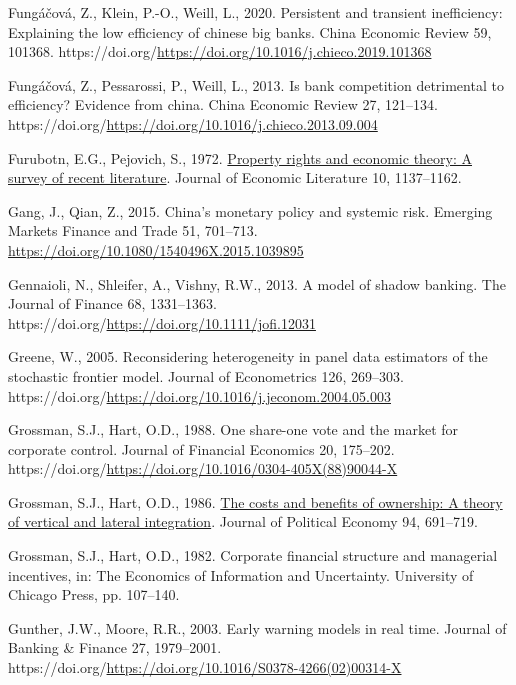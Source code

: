 \documentclass[
  letterpaper,
  DIV=11,
  numbers=noendperiod]{scrreprt}
\newlength{\cslhangindent}
\newenvironment{CSLReferences}[2] %
 {\begin{list}{}{%
  \setlength{\itemindent}{0pt}
  \setlength{\leftmargin}{0pt}
  \setlength{\parsep}{0pt}
  \ifodd #1
   \setlength{\leftmargin}{\cslhangindent}
   \setlength{\itemindent}{-1\cslhangindent}
  \fi
  \setlength{\itemsep}{#2\baselineskip}}}
 {\end{list}}
\begin{document}
\begin{CSLReferences}{1}{0}
Fungáčová, Z., Klein, P.-O., Weill, L., 2020. Persistent and transient
inefficiency: Explaining the low efficiency of chinese big banks. China
Economic Review 59, 101368.
https://doi.org/\url{https://doi.org/10.1016/j.chieco.2019.101368}

Fungáčová, Z., Pessarossi, P., Weill, L., 2013. Is bank competition
detrimental to efficiency? Evidence from china. China Economic Review
27, 121--134.
https://doi.org/\url{https://doi.org/10.1016/j.chieco.2013.09.004}

Furubotn, E.G., Pejovich, S., 1972.
\href{http://www.jstor.org/stable/2721541}{Property rights and economic
theory: A survey of recent literature}. Journal of Economic Literature
10, 1137--1162.

Gang, J., Qian, Z., 2015. China's monetary policy and systemic risk.
Emerging Markets Finance and Trade 51, 701--713.
\url{https://doi.org/10.1080/1540496X.2015.1039895}

Gennaioli, N., Shleifer, A., Vishny, R.W., 2013. A model of shadow
banking. The Journal of Finance 68, 1331--1363.
https://doi.org/\url{https://doi.org/10.1111/jofi.12031}

Greene, W., 2005. Reconsidering heterogeneity in panel data estimators
of the stochastic frontier model. Journal of Econometrics 126, 269--303.
https://doi.org/\url{https://doi.org/10.1016/j.jeconom.2004.05.003}

Grossman, S.J., Hart, O.D., 1988. One share-one vote and the market for
corporate control. Journal of Financial Economics 20, 175--202.
https://doi.org/\url{https://doi.org/10.1016/0304-405X(88)90044-X}

Grossman, S.J., Hart, O.D., 1986.
\href{http://www.jstor.org/stable/1833199}{The costs and benefits of
ownership: A theory of vertical and lateral integration}. Journal of
Political Economy 94, 691--719.

Grossman, S.J., Hart, O.D., 1982. Corporate financial structure and
managerial incentives, in: The Economics of Information and Uncertainty.
University of Chicago Press, pp. 107--140.

Gunther, J.W., Moore, R.R., 2003. Early warning models in real time.
Journal of Banking \& Finance 27, 1979--2001.
https://doi.org/\url{https://doi.org/10.1016/S0378-4266(02)00314-X}


\end{CSLReferences}
\end{document}

